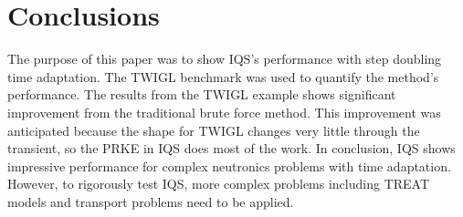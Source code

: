 \documentclass{anstrans}
\begin{document}
%
%

\section{Conclusions}

The purpose of this paper was to show IQS's performance with step doubling time adaptation.  The TWIGL benchmark was used to quantify the method's performance.  The results from the TWIGL example shows significant improvement from the traditional brute force method.  This improvement was anticipated because the shape for TWIGL changes very little through the transient, so the PRKE in IQS does most of the work.  In conclusion, IQS shows impressive performance for complex neutronics problems with time adaptation.  However, to rigorously test IQS, more complex problems including TREAT models and transport problems need to be applied.

\end{document}
